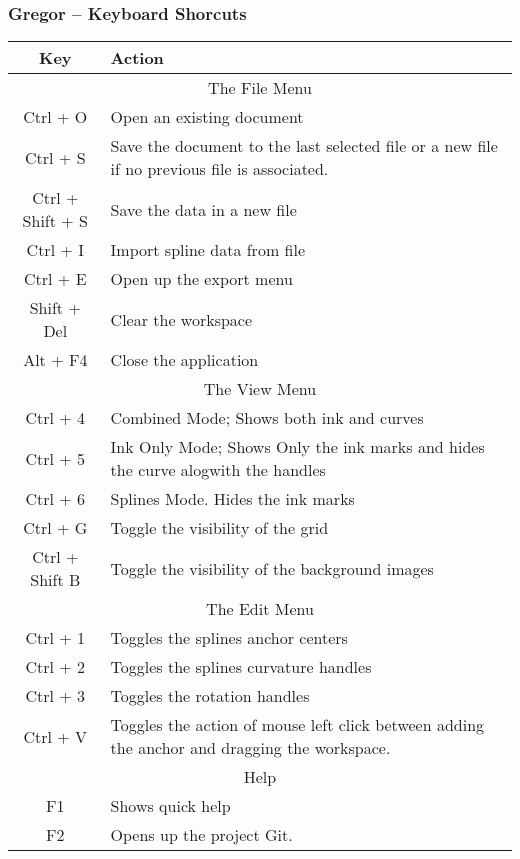 \subsubsection{Gregor -- Keyboard Shorcuts}
{
    \begin{tabular}{|c|l|}
      \hline
      Key & Action \\
      \hline
      \multicolumn{2}{|c|}{The File Menu} \\
      \hline
      Ctrl + O & Open an existing document \\
      Ctrl + S & Save the document to the last selected file or a new file if no previous file is associated. \\
      Ctrl + Shift + S & Save the data in a new file \\
      Ctrl + I & Import spline data from file \\
      Ctrl + E & Open up the export menu \\
      Shift + Del  & Clear the workspace \\
      Alt + F4 & Close the application \\
      \hline
      \multicolumn{2}{|c|}{The View Menu} \\
      \hline
      Ctrl + 4 & Combined Mode; Shows both ink and curves \\
      Ctrl + 5 & Ink Only Mode; Shows Only the ink marks and hides the curve alogwith the handles \\
      Ctrl + 6 & Splines Mode. Hides the ink marks \\
      Ctrl + G & Toggle the visibility of the grid \\
      Ctrl + Shift B & Toggle the visibility of the background images \\
      \hline
      \multicolumn{2}{|c|}{The Edit Menu} \\
      \hline
      Ctrl + 1 & Toggles the splines anchor centers \\
      Ctrl + 2 & Toggles the splines curvature handles \\
      Ctrl + 3 & Toggles the rotation handles \\
      Ctrl + V & Toggles the action of mouse left click between adding the anchor and dragging the workspace. \\
      \hline
      \multicolumn{2}{|c|}{Help}\\
      \hline
      F1 & Shows quick help \\
      F2 & Opens up the project Git.\\
      \hline
    \end{tabular}\label{Table:Keyboardshortcuts}
}
